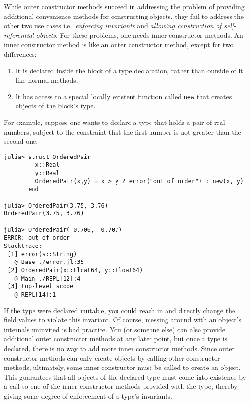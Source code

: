 \documentclass[
]{article}
\providecommand{\tightlist}{%
  \setlength{\itemsep}{0pt}\setlength{\parskip}{0pt}}
\begin{document}
While outer constructor methods succeed in addressing the problem of
providing additional convenience methods for constructing objects, they
fail to address the other two use cases i.e.~\emph{enforcing invariants}
and \emph{allowing construction of self-referential objects}. For these
problems, one needs inner constructor methods. An inner constructor
method is like an outer constructor method, except for two differences:

\begin{enumerate}
\def\labelenumi{\arabic{enumi}.}
\tightlist
\item
  It is declared inside the block of a type declaration, rather than
  outside of it like normal methods.
\item
  It has access to a special locally existent function called
  \texttt{new} that creates objects of the block's type.
\end{enumerate}

For example, suppose one wants to declare a type that holds a pair of
real numbers, subject to the constraint that the first number is not
greater than the second one:

\begin{verbatim}
julia> struct OrderedPair
         x::Real
         y::Real
         OrderedPair(x,y) = x > y ? error("out of order") : new(x, y)
       end

julia> OrderedPair(3.75, 3.76)
OrderedPair(3.75, 3.76)

julia> OrderedPair(-0.706, -0.707)
ERROR: out of order
Stacktrace:
 [1] error(s::String)
   @ Base ./error.jl:35
 [2] OrderedPair(x::Float64, y::Float64)
   @ Main ./REPL[12]:4
 [3] top-level scope
   @ REPL[14]:1
\end{verbatim}

If the type were declared mutable, you could reach in and directly
change the field values to violate this invariant. Of course, messing
around with an object's internals uninvited is bad practice. You (or
someone else) can also provide additional outer constructor methods at
any later point, but once a type is declared, there is no way to add
more inner constructor methods. Since outer constructor methods can only
create objects by calling other constructor methods, ultimately, some
inner constructor must be called to create an object. This guarantees
that all objects of the declared type must come into existence by a call
to one of the inner constructor methods provided with the type, thereby
giving some degree of enforcement of a type's invariants.
\end{document}
